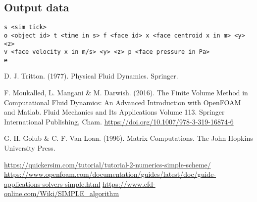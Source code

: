\documentclass[12pt]{article}
\begin{document}
\subsection{Output data}

\begin{verbatim}
s <sim tick>
o <object id> t <time in s> f <face id> x <face centroid x in m> <y> <z> 
v <face velocity x in m/s> <y> <z> p <face pressure in Pa>
e
\end{verbatim}

\begin{thebibliography}{9}
   D. J. Tritton. (1977). Physical Fluid Dynamics. Springer.
  
 F. Moukalled, L. Mangani \& M. Darwish. (2016). The Finite Volume Method in Computational Fluid Dynamics: An Advanced Introduction with OpenFOAM and Matlab. Fluid Mechanics and Its Applications Volume 113. Springer International Publishing, Cham. \url{https://doi.org/10.1007/978-3-319-16874-6}

   G. H. Golub \& C. F. Van Loan. (1996). Matrix Computations. The John Hopkins University Press.
  
 \url{https://quickersim.com/tutorial/tutorial-2-numerics-simple-scheme/}
 \url{https://www.openfoam.com/documentation/guides/latest/doc/guide-applications-solvers-simple.html}
 \url{https://www.cfd-online.com/Wiki/SIMPLE_algorithm}

\end{thebibliography}
\end{document}
